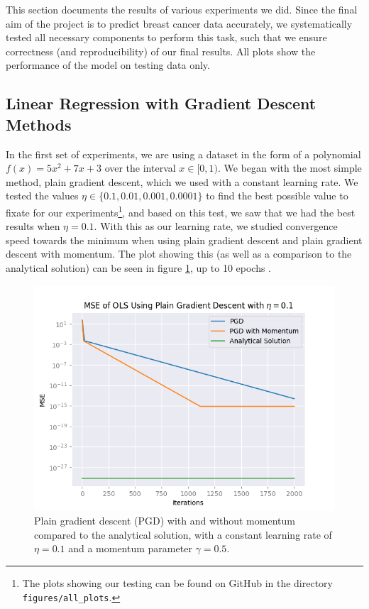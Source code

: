 This section documents the results of various experiments we did. Since the final aim of the
project is to predict breast cancer data accurately, we systematically tested all necessary components to perform this task, such that we ensure correctness (and reproducibility) of our final results. All plots show the performance of the model on testing data only.

\subsection{Linear Regression with Gradient Descent Methods}
In the first set of experiments, we are using a dataset in the form of a polynomial $f(x) = 5x^2 + 7x +3$ over the interval $x \in [0,1)$. We began with the most simple method, plain gradient descent, which we used with a constant learning rate. We tested the values $\eta \in \{ 0.1, 0.01, 0.001, 0.0001\}$ to find the best possible value to fixate for our experiments\footnote{The plots showing our testing can be found on GitHub in the directory \texttt{figures/all\_plots}.}, and based on this test, we saw that we had the best results when $\eta = 0.1$. With this as our learning rate, we studied convergence speed towards the minimum when using plain gradient descent and plain gradient descent with momentum. The plot showing this (as well as a comparison to the analytical solution) can be seen in figure \ref{fig:plainVSanalytical}, up to 10 epochs \cite{mediumEpochNumber}\cite{epochsBreastCancerArticle}.
\begin{figure}
    \centering
    \includegraphics[width=\linewidth]{figures/all_plots/plain_mse_pr_iter_eta_1e-1.png}
    \caption{Plain gradient descent (PGD) with and without momentum compared to the analytical solution, with a constant learning rate of $\eta = 0.1$ and a momentum parameter $\gamma = 0.5$.}
    \label{fig:plainVSanalytical}
\end{figure}

